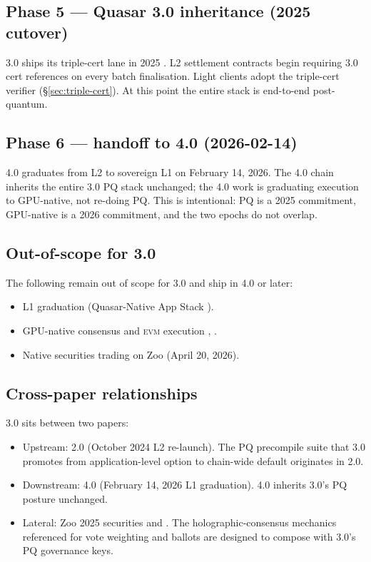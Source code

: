 \subsection{Phase 5 --- Quasar 3.0 inheritance (2025 cutover)}

\Lux{} \Quasar{} 3.0 ships its triple-cert lane in 2025
\cite{lp-020}. \Zoo{} L2 settlement contracts begin requiring
\Quasar{} 3.0 cert references on every batch finalisation. Light
clients adopt the triple-cert verifier (\S\ref{sec:triple-cert}).
At this point the entire \Zoo{} stack is end-to-end post-quantum.

\subsection{Phase 6 --- handoff to 4.0 (2026-02-14)}

\Zoo{} 4.0 \cite{zoo-4-0} graduates \Zoo{} from L2 to sovereign L1
on February 14, 2026. The 4.0 chain inherits the entire 3.0 PQ stack
unchanged; the 4.0 work is graduating execution to GPU-native, not
re-doing PQ. This is intentional: PQ is a 2025 commitment, GPU-native
is a 2026 commitment, and the two epochs do not overlap.

\subsection{Out-of-scope for 3.0}

The following remain out of scope for 3.0 and ship in 4.0 or later:

\begin{itemize}[leftmargin=1.2em]
  \item L1 graduation (Quasar-Native App Stack \cite{zoo-4-0}).
  \item GPU-native consensus and \textsc{evm} execution
        \cite{lp-009}, \cite{zoo-4-0}.
  \item Native securities trading on Zoo \DEX{} (April 20, 2026).
\end{itemize}

\subsection{Cross-paper relationships}

\Zoo{} 3.0 sits between two papers:

\begin{itemize}[leftmargin=1.2em]
  \item Upstream: \Zoo{} 2.0 \cite{zoo-2-0} (October 2024 L2
        re-launch). The PQ precompile suite that 3.0 promotes from
        application-level option to chain-wide default originates
        in 2.0.
  \item Downstream: \Zoo{} 4.0 \cite{zoo-4-0} (February 14, 2026 L1
        graduation). 4.0 inherits 3.0's PQ posture unchanged.
  \item Lateral: Zoo 2025 securities and \DAO{}
        \cite{zoo-2025-securities-and-dao}. The holographic-consensus
        \DAO{} mechanics referenced for vote weighting and \FHE{}
        ballots are designed to compose with 3.0's PQ governance keys.
\end{itemize}

